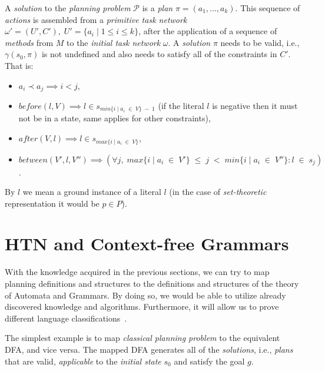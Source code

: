 \begin{defn}\label{def02:13}
    A \emph{solution} to the \emph{planning problem} $\mathcal{P}$ is a \emph{plan} $\pi=(a_1,\dots,a_k)$. This sequence of \emph{actions} is assembled from a \emph{primitive task network} $\omega'=(U', C'), \; U' = 
 \{a_i \; | \; 1 \leq i \leq k\}$, after the application of a sequence of \emph{methods} from $M$ to the \emph{initial task network} $\omega$. A \emph{solution} $\pi$ needs to be valid, i.e., $\gamma(s_0,\pi)$ is not undefined and also needs to satisfy all of the constraints in $C'$. That is:
    
    \begin{itemize}
        \item $a_i \prec a_j \implies i < j$,
        
        \item $before(l, V) \implies l \in s_{min\{i \; | \; a_i \; \in \; V\} \; - \; 1}$ (if the literal $l$ is negative then it must not be in a state, same applies for other constraints),
        
        \item $after(V,l) \implies l \in s_{max\{i \; | \; a_i \; \in \; V\}}$,
        
        \item $between(V',l,V'') \implies (\forall j, \; max\{i \; | \; a_i \; \in \; V'\} \; \leq \; j \; < \; min\{i \; | \; a_i \; \in \; V''\}: l \; \in \; s_j)$.
    \end{itemize}
    
    By $l$ we mean a ground instance of a literal $l$ (in the case of \emph{set-theoretic} representation it would be $p \in P$).
\end{defn}

\section{HTN and Context-free Grammars}

\medskip\noindent
With the knowledge acquired in the previous sections, we can try to map planning definitions and structures to the definitions and structures of the theory of Automata and Grammars. By doing so, we would be able to utilize already discovered knowledge and algorithms. Furthermore, it will allow us to prove different language classifications~\cite{langclassification}.

\medskip\noindent
The simplest example is to map \emph{classical planning problem} to the equivalent DFA, and vice versa. The mapped DFA generates all of the \emph{solutions}, i.e., \emph{plans} that are valid, \emph{applicable} to the \emph{initial state} $s_0$ and satisfy the goal $g$.


